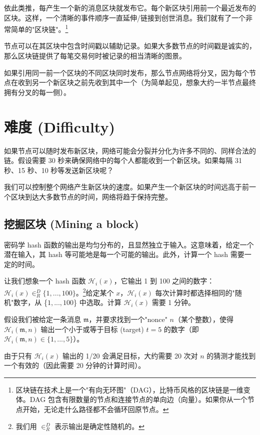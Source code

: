 依此类推，每产生一个新的消息区块就发布它。每个新区块引用前一个最近发布的区块。这样，一个清晰的事件顺序一直延伸/链接到创世消息。我们就有了一个非常简单的"区块链"。\footnote{区块链在技术上是一个"有向无环图"（DAG），比特币风格的区块链是一维变体。DAG 包含有限数量的节点和连接节点的单向边（向量）。如果你从一个节点开始，无论走什么路径都不会循环回原节点。\cite{DAG-wikipedia}}

节点可以在其区块中包含时间戳以辅助记录。如果大多数节点的时间戳是诚实的，那么区块链提供了每笔交易何时被记录的相当清晰的图景。

如果引用同一前一个区块的不同区块同时发布，那么节点网络将分叉，因为每个节点在收到另一个新区块之前先收到其中一个（为简单起见，想象大约一半节点最终拥有分叉的每一侧）。



\section{难度 (Difficulty)}
\label{sec:difficulty}

如果节点可以随时发布新区块，网络可能会分裂并分化为许多不同的、同样合法的链。假设需要 30 秒来确保网络中的每个人都能收到一个新区块。如果每隔 31 秒、15 秒、10 秒等发送新区块呢？

我们可以控制整个网络产生新区块的速度。如果产生一个新区块的时间远高于前一个区块到达大多数节点的时间，网络将趋于保持完整。


\subsection{挖掘区块 (Mining a block)}

密码学 hash 函数的输出是均匀分布的，且显然独立于输入。这意味着，给定一个潜在输入，其 hash 等可能地是每一个可能的输出。此外，计算一个 hash 需要一定的时间。

让我们想象一个 hash 函数 $\mathcal{H}_i(x)$，它输出 1 到 100 之间的数字：$\mathcal{H}_i(x) \in^D_R \{1,...,100\}$。\footnote{我们用 $\in^D_R$ 表示输出是确定性随机的。}给定某个 $x$，$\mathcal{H}_i(x)$ 每次计算时都选择相同的"随机"数字，从 \{$1,...,100$\} 中选取。计算 $\mathcal{H}_i(x)$ 需要 1 分钟。

假设我们被给定一条消息 $\mathfrak{m}$，并要求找到一个"nonce" $n$（某个整数），使得 $\mathcal{H}_i(\mathfrak{m},n)$ 输出一个小于或等于{目标 (target)} $t = 5$ 的数字（即 $\mathcal{H}_i(\mathfrak{m},n) \in \{1,...,5\}$）。 

由于只有 $\mathcal{H}_i(x)$ 输出的 1/20 会满足目标，大约需要 20 次对 $n$ 的猜测才能找到一个有效的（因此需要 20 分钟的计算时间）。

